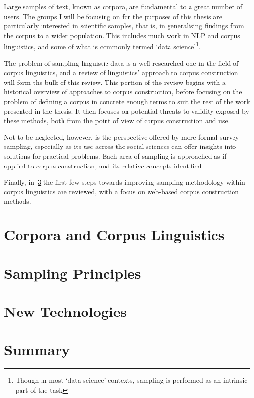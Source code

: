 Large samples of text, known as corpora, are fundamental to a great number of users.  The groups I will be focusing on for the purposes of this thesis are particularly interested in scientific samples, that is, in generalising findings from the corpus to a wider population.  This includes much work in NLP and corpus linguistics, and some of what is commonly termed `data science'\footnote{Though in most `data science' contexts, sampling is performed as an intrinsic part of the task}.


The problem of sampling linguistic data is a well-researched one in the field of corpus linguistics, and a review of linguistics' approach to corpus construction will form the bulk of this review.  This portion of the review begins with a historical overview of approaches to corpus construction, before focusing on the problem of defining a corpus in concrete enough terms to suit the rest of the work presented in the thesis.  It then focuses on potential threats to validity exposed by these methods, both from the point of view of corpus construction and use.

Not to be neglected, however, is the perspective offered by more formal survey sampling, especially as its use across the social sciences can offer insights into solutions for practical problems.  Each area of sampling is approached as if applied to corpus construction, and its relative concepts identified.

Finally, in~\ref{sec:litreview:newtech} the first few steps towards improving sampling methodology within corpus linguistics are reviewed, with a focus on web-based corpus construction methods.




\section{Corpora and Corpus Linguistics}
\label{sec:litreview:corpora}




\section{Sampling Principles}
\label{sec:litreview:sampling}




\section{New Technologies} %
\label{sec:litreview:newtech}




\section{Summary}
\label{sec:litreview:summary}

